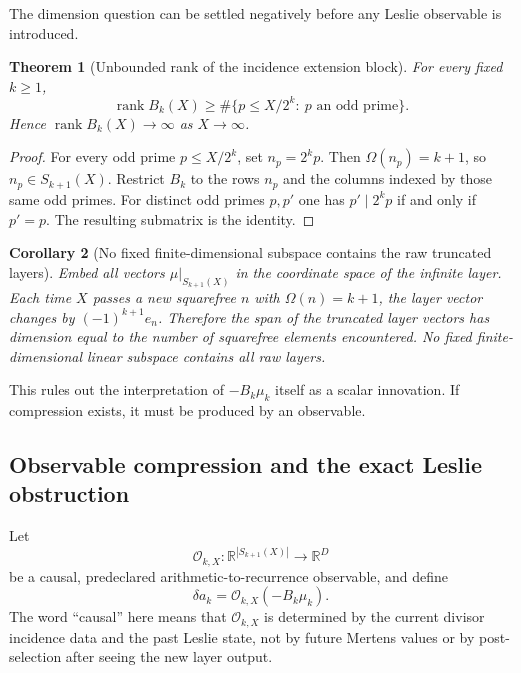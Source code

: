 \documentclass[11pt]{amsart}
\numberwithin{equation}{section}
\theoremstyle{plain}
\newtheorem{theorem}{Theorem}[section]
\newtheorem{corollary}[theorem]{Corollary}
\theoremstyle{definition}
\theoremstyle{remark}
\begin{document}
The dimension question can be settled negatively before any Leslie observable is introduced.

\begin{theorem}[Unbounded rank of the incidence extension block]
\label{thm:v9_Bk_unbounded_rank}
For every fixed $k\ge1$,
\begin{equation}
\boxed{
\operatorname{rank}B_k(X)
\ge
\#\{p\le X/2^k:\ p\text{ an odd prime}\}.
}
\label{eq:v9_Bk_rank_lower}
\end{equation}
Hence $\operatorname{rank}B_k(X)\to\infty$ as $X\to\infty$.
\end{theorem}

\begin{proof}
For every odd prime $p\le X/2^k$, set $n_p=2^kp$.  Then
$\Omega(n_p)=k+1$, so $n_p\in S_{k+1}(X)$.  Restrict $B_k$ to the rows $n_p$ and the columns
indexed by those same odd primes.  For distinct odd primes $p,p'$ one has
$p'\mid2^kp$ if and only if $p'=p$.  The resulting submatrix is the identity.
\end{proof}

\begin{corollary}[No fixed finite-dimensional subspace contains the raw truncated layers]
\label{cor:v9_no_fixed_layer_subspace}
Embed all vectors $\mu|_{S_{k+1}(X)}$ in the coordinate space of the infinite layer.  Each time
$X$ passes a new squarefree $n$ with $\Omega(n)=k+1$, the layer vector changes by
$(-1)^{k+1}e_n$.  Therefore the span of the truncated layer vectors has dimension equal to the
number of squarefree elements encountered.  No fixed finite-dimensional linear subspace contains
all raw layers.
\end{corollary}

This rules out the interpretation of $-B_k\mu_k$ itself as a scalar innovation.  If compression
exists, it must be produced by an observable.

\subsection{Observable compression and the exact Leslie obstruction}
\label{subsec:v9_observable_compression}

Let
\begin{equation}
\mathcal O_{k,X}:\mathbb R^{|S_{k+1}(X)|}\longrightarrow\mathbb R^D
\label{eq:v9_observable_O}
\end{equation}
be a causal, predeclared arithmetic-to-recurrence observable, and define
\begin{equation}
\delta a_k=
\mathcal O_{k,X}(-B_k\mu_k).
\label{eq:v9_delta_a_observable}
\end{equation}
The word ``causal'' here means that $\mathcal O_{k,X}$ is determined by the current divisor
incidence data and the past Leslie state, not by future Mertens values or by post-selection after
seeing the new layer output.
\end{document}
